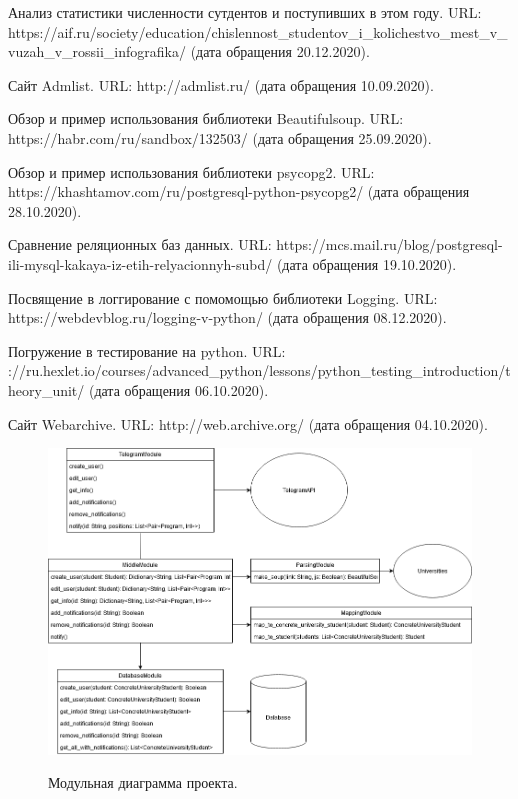 \documentclass[a4paper,article,14pt]{extarticle}
\begin{document}
\begin{thebibliography}{1}
 Анализ статистики численности сутдентов и поступивших в этом году. URL: https://aif.ru/society/education/chislennost\_studentov\_i\_kolichestvo\_mest\_v\_vuzah\_v\_rossii\_infografika/ (дата обращения 20.12.2020).

 Сайт Admlist. URL: http://admlist.ru/ (дата обращения 10.09.2020).

 Обзор и пример использования библиотеки Beautifulsoup. URL: https://habr.com/ru/sandbox/132503/ (дата обращения 
25.09.2020).

 Обзор и пример использования библиотеки psycopg2. URL: https://khashtamov.com/ru/postgresql-python-psycopg2/ (дата обращения 28.10.2020).

 Сравнение реляционных баз данных. URL: https://mcs.mail.ru/blog/postgresql-ili-mysql-kakaya-iz-etih-relyacionnyh-subd/ (дата обращения 19.10.2020).

 Посвящение в логгирование с помомощью библиотеки Logging. URL: https://webdevblog.ru/logging-v-python/ (дата обращения 08.12.2020).

 Погружение в тестирование на python. URL: \https://ru.hexlet.io/courses/advanced_python/lessons/python_testing_introduction/theory_unit/ (дата обращения 06.10.2020).

 Сайт Webarchive. URL: http://web.archive.org/ (дата обращения 04.10.2020).

\end{thebibliography}

\pagebreak


\begin{figure} [ht]
\begin{center}
\scalebox{0.5} {
    \includegraphics{images/modulediagram.png}
}

\caption{
\label{diagram}
	Модульная диаграмма проекта.
}
\end{center}
\end{figure}
\end{document}
